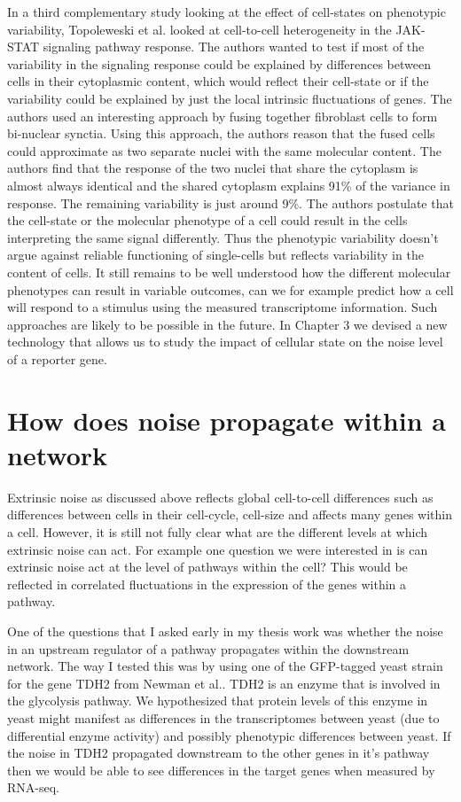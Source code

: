 In a third complementary study looking at the effect of cell-states on phenotypic variability, Topoleweski et al. \cite{topolewski2022ssb} looked at cell-to-cell heterogeneity in the JAK-STAT signaling pathway response. The authors wanted to test if most of the variability in the signaling response could be explained by differences between cells in their cytoplasmic content, which would reflect their cell-state or if the variability could be explained by just the local intrinsic fluctuations of genes. The authors used an interesting approach by fusing together fibroblast cells to form bi-nuclear synctia. Using this approach, the authors reason that the fused cells could approximate as two separate nuclei with the same molecular content. The authors find that the response of the two nuclei that share the cytoplasm is almost always identical and the shared cytoplasm explains 91\% of the variance in response. The remaining variability is just around 9\%. The authors postulate that the cell-state or the molecular phenotype of a cell could result in the cells interpreting the same signal differently. Thus the phenotypic variability doesn't argue against reliable functioning of single-cells but reflects variability in the content of cells. It still remains to be well understood how the different molecular phenotypes can result in variable outcomes, can we for example predict how a cell will respond to a stimulus using the measured transcriptome information. Such approaches are likely to be possible in the future. In Chapter 3 we devised a new technology that allows us to study the impact of cellular state on the noise level of a reporter gene.

\section{How does noise propagate within a network}

Extrinsic noise as discussed above reflects global cell-to-cell differences such as differences between cells in their cell-cycle, cell-size and affects many genes within a cell. However, it is still not fully clear what are the different levels at which extrinsic noise can act. For example one question we were interested in is can extrinsic noise act at the level of pathways within the cell? This would be reflected in correlated fluctuations in the expression of the genes within a pathway.

One of the questions that I asked early in my thesis work was whether the noise in an upstream regulator of a pathway propagates within the downstream network. The way I tested this was by using one of the GFP-tagged yeast strain for the gene TDH2 from Newman et al.\cite{newman2006na}. TDH2 is an enzyme that is involved in the glycolysis pathway. We hypothesized that protein levels of this enzyme in yeast might manifest as differences in the transcriptomes between yeast (due to differential enzyme activity) and possibly phenotypic differences between yeast. If the noise in TDH2 propagated downstream to the other genes in it's pathway then we would be able to see differences in the target genes when measured by RNA-seq. 

